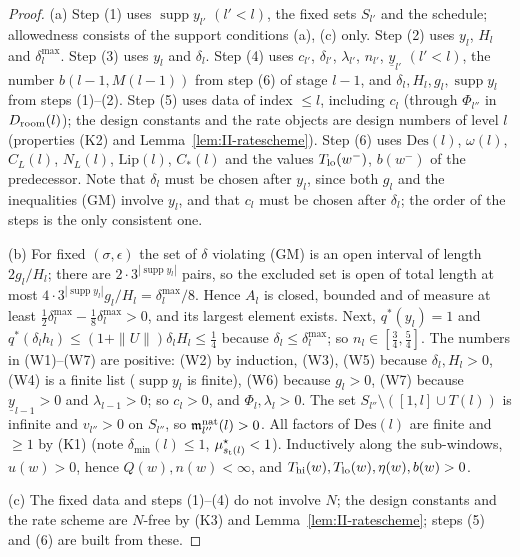 \documentclass[10pt]{amsart}
\theoremstyle{definition}
\theoremstyle{remark}
\newcommand{\supp}{\operatorname{supp}}
\begin{document}
\begin{proof}
(a) Step (1) uses $\supp y_{l'}$ $(l'<l)$, the fixed sets $S_{l'}$ and the
schedule; allowedness consists of the support conditions (a), (c) only.
Step (2) uses $y_l$, $H_l$ and $\delta^{\max}_l$.  Step (3) uses $y_l$ and
$\delta_l$.  Step (4) uses $c_{l'}$, $\delta_{l'}$, $\lambda_{l'}$,
$n_{l'}$, $\underline y_{l'}$ $(l'<l)$, the number $b(l-1,M(l-1))$ from
step (6) of stage $l-1$, and $\delta_l,H_l,g_l,\supp y_l$ from steps
(1)--(2).  Step (5) uses data of index $\le l$, including $c_l$ (through
$\Phi_{l''}$ in $D_{\rm room}(l)$); the design constants and the rate
objects are design numbers of level $l$ (properties (K2) and
Lemma~\ref{lem:II-ratescheme}).  Step (6) uses $\mathrm{Des}(l)$,
$\omega(l)$, $C_L(l)$, $N_L(l)$, $\mathrm{Lip}(l)$, $C_*(l)$ and the values
$T_{\rm lo}(w^-)$, $b(w^-)$ of the predecessor.  Note that $\delta_l$ must
be chosen after $y_l$, since both $g_l$ and the inequalities (GM) involve
$y_l$, and that $c_l$ must be chosen after $\delta_l$; the order of the
steps is the only consistent one.

(b) For fixed $(\sigma,\epsilon)$ the set of $\delta$ violating (GM) is
an open interval of length $2g_l/H_l$; there are $2\cdot3^{|\supp y_l|}$
pairs, so the excluded set is open of total length at most
$4\cdot3^{|\supp y_l|}g_l/H_l=\delta^{\max}_l/8$.  Hence $A_l$ is closed,
bounded and of measure at least $\frac12\delta^{\max}_l-\frac18
\delta^{\max}_l>0$, and its largest element exists.  Next,
$q^*(y_l)=1$ and $q^*(\delta_lh_l)\le(1+\|U\|)\delta_lH_l\le\frac14$
because $\delta_l\le\delta^{\max}_l$; so $n_l\in[\frac34,\frac54]$.  The
numbers in (W1)--(W7) are positive: (W2) by induction, (W3), (W5) because
$\delta_l,H_l>0$, (W4) is a finite list ($\supp y_l$ is finite), (W6)
because $g_l>0$, (W7) because $\underline y_{l-1}>0$ and
$\lambda_{l-1}>0$; so $c_l>0$, and $\Phi_l,\lambda_l>0$.  The set
$S_{l''}\setminus([1,l]\cup T(l))$ is infinite and $v_{l''}>0$ on
$S_{l''}$, so $\mathfrak m^{\rm nat}_{l''}(l)>0$.  All factors of
$\mathrm{Des}(l)$ are finite and $\ge1$ by (K1) (note $\delta_{\min}(l)\le
1$, $\mu^\star_{s_{\rm t}(l)}<1$).  Inductively along the sub-windows,
$u(w)>0$, hence $Q(w),n(w)<\infty$, and $T_{\rm hi}(w),T_{\rm lo}(w),
\eta(w),b(w)>0$.

(c) The fixed data and steps (1)--(4) do not involve $N$; the design
constants and the rate scheme are $N$-free by (K3) and
Lemma~\ref{lem:II-ratescheme}; steps (5) and (6) are built from these.
\end{proof}
\end{document}
